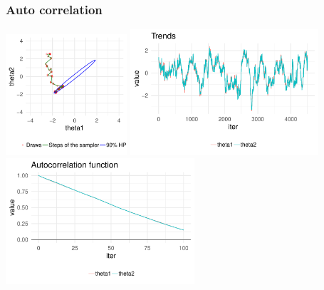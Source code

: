 \documentclass[10pt]{beamer}
\begin{document}
\begin{frame}

\frametitle{Auto correlation}

  \vspace{-0.5\baselineskip}
  \includegraphics[width=4.5cm]{figs/Metrop2.pdf}
  {\includegraphics[width=7cm]{figs/Metrop2trace.pdf}\\}
  {\includegraphics[width=7cm]{figs/Metrop2acf.pdf}}

\end{frame}
\end{document}
